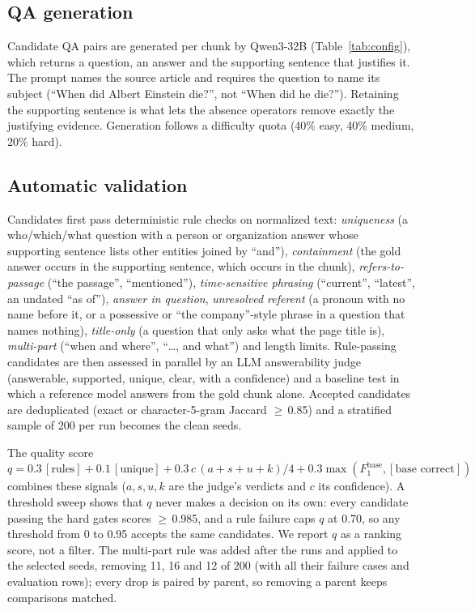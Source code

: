 \documentclass[conference]{IEEEtran}
\begin{document}
\subsection{QA generation}
Candidate QA pairs are generated per chunk by Qwen3-32B (Table~\ref{tab:config}), which returns a
question, an answer and the supporting sentence that justifies it. The prompt names the source
article and requires the question to name its subject (``When did Albert Einstein die?'', not
``When did he die?''). Retaining the supporting sentence is what lets the absence operators
remove exactly the justifying evidence. Generation follows a difficulty quota (40\% easy,
40\% medium, 20\% hard).

\subsection{Automatic validation}
\label{sec:validation}
Candidates first pass deterministic rule checks on normalized text: \emph{uniqueness}
(a who/which/what question with a person or organization answer whose supporting sentence lists
other entities joined by ``and''), \emph{containment} (the gold answer occurs in the supporting
sentence, which occurs in the chunk), \emph{refers-to-passage} (``the passage'',
``mentioned''), \emph{time-sensitive phrasing} (``current'', ``latest'', an undated ``as of''),
\emph{answer in question}, \emph{unresolved referent} (a pronoun with no name before it, or a
possessive or ``the company''-style phrase in a question that names nothing),
\emph{title-only} (a question that only asks what the page title is), \emph{multi-part}
(``when and where'', ``\dots, and what'') and length limits. Rule-passing candidates are then
assessed in parallel by an LLM answerability judge (answerable, supported, unique, clear, with a
confidence) and a baseline test in which a reference model answers from the gold chunk alone.
Accepted candidates are deduplicated (exact or character-5-gram Jaccard $\ge$\,0.85) and a
stratified sample of 200 per run becomes the clean seeds.

The quality score $q = 0.3\,[\text{rules}] + 0.1\,[\text{unique}] + 0.3\,c\,(a{+}s{+}u{+}k)/4 +
0.3\max(F_1^{\text{base}}, [\text{base correct}])$ combines these signals ($a,s,u,k$ are the
judge's verdicts and $c$ its confidence). A threshold sweep shows that $q$ never makes a
decision on its own: every candidate passing the hard gates scores $\ge$\,0.985, and a rule
failure caps $q$ at 0.70, so any threshold from 0 to 0.95 accepts the same candidates. We report
$q$ as a ranking score, not a filter. The multi-part rule was added after the runs and applied to
the selected seeds, removing 11, 16 and 12 of 200 (with all their failure cases and evaluation
rows); every drop is paired by parent, so removing a parent keeps comparisons matched.
\end{document}
